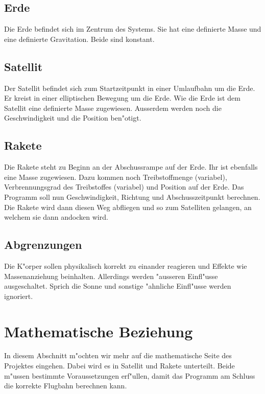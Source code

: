 \documentclass[11pt]{report}
\begin{document}
\section{Erde}
Die Erde befindet sich im Zentrum des 				Systems. Sie hat eine definierte Masse und 			eine definierte Gravitation. Beide sind 				konstant.
\section{Satellit}
Der Satellit befindet sich zum Startzeitpunkt in 	einer Umlaufbahn um die Erde. Er kreist in 			einer elliptischen Bewegung um die Erde. Wie die 	Erde ist dem Satellit eine definierte Masse 			zugewiesen. Ausserdem werden noch die 				Geschwindigkeit und die Position ben"otigt.
\section{Rakete}
Die Rakete steht zu Beginn an der Abschussrampe 		auf der Erde. Ihr ist ebenfalls eine Masse 			zugewiesen. Dazu kommen noch Treibstoffmenge 		(variabel), Verbrennungsgrad des Treibstoffes 		(variabel) und Position auf der Erde. Das 			Programm soll nun Geschwindigkeit, Richtung und 		Abschusszeitpunkt berechnen. Die Rakete wird 		dann diesen Weg abfliegen und so zum Satelliten 		gelangen, an welchem sie dann andocken wird.
\section{Abgrenzungen}
Die K"orper sollen physikalisch korrekt zu 			einander reagieren und Effekte wie 					Massenanziehung beinhalten. Allerdings werden 		"ausseren Einfl"usse ausgeschaltet. Sprich die 		Sonne und sonstige "ahnliche Einfl"usse werden 		ignoriert.
		
\newpage
		
\chapter{Mathematische Beziehung}
In diesem Abschnitt m"ochten wir mehr auf die 		mathematische Seite des Projektes eingehen. Dabei 	wird es in Satellit und Rakete unterteilt. Beide 	m"ussen bestimmte Voraussetzungen erf"ullen, damit das 	Programm am Schluss die korrekte Flugbahn berechnen kann.
		
\end{document}
